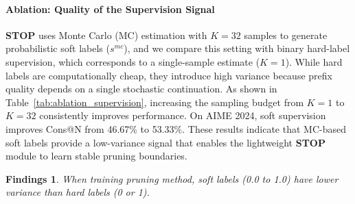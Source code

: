 \documentclass[11pt]{article}
\theoremstyle{plain}
\newtheorem{findings}{Findings}
\begin{document}
\paragraph{Ablation: Quality of the Supervision Signal}
\textbf{STOP} uses Monte Carlo (MC) estimation with $K=32$ samples to generate probabilistic soft labels ($s^{mc}$), and we compare this setting with binary hard-label supervision, which corresponds to a single-sample estimate ($K=1$). While hard labels are computationally cheap, they introduce high variance because prefix quality depends on a single stochastic continuation. As shown in Table~\ref{tab:ablation_supervision}, increasing the sampling budget from $K=1$ to $K=32$ consistently improves performance. On AIME 2024, soft supervision improves Cons@N from 46.67\% to 53.33\%. These results indicate that MC-based soft labels provide a low-variance signal that enables the lightweight \textbf{STOP} module to learn stable pruning boundaries.

\begin{table}[ht]
\centering

\caption{Performance comparison between hard labels ($K=1$) and MC-estimated soft labels ($K=32$).}
\label{tab:ablation_supervision}
\vspace{-4mm}
\end{table}

\begin{findings}
When training pruning method, soft labels (0.0 to 1.0) have lower variance than hard labels (0 or 1).
\end{findings}
\end{document}
